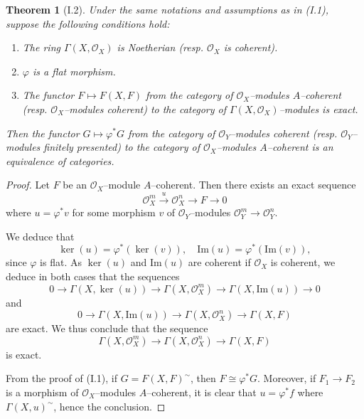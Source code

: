 \documentclass[10pt,a4paper]{amsart}
\newtheorem{theorem}{Theorem}
\begin{document}
\begin{theorem}[I.2]
Under the same notations and assumptions as in (I.1), suppose the following conditions hold:
\begin{enumerate}
\item The ring $\Gamma(X, \mathcal{O}_X)$ is Noetherian (resp. $\mathcal{O}_X$ is coherent).
\item $\varphi$ is a flat morphism.
\item The functor $F \mapsto F(X, F)$ from the category of $\mathcal{O}_X$–modules $A$–coherent (resp. $\mathcal{O}_X$–modules coherent) to the category of $\Gamma(X, \mathcal{O}_X)$–modules is exact.
\end{enumerate}
Then the functor $G \mapsto \varphi^* G$ from the category of $\mathcal{O}_Y$–modules coherent (resp. $\mathcal{O}_Y$–modules finitely presented) to the category of $\mathcal{O}_X$–modules $A$–coherent is an equivalence of categories.
\end{theorem}

\begin{proof}
Let $F$ be an $\mathcal{O}_X$–module $A$–coherent. Then there exists an exact sequence
\[
\mathcal{O}_X^m \xrightarrow{u} \mathcal{O}_X^n \longrightarrow F \longrightarrow 0
\]
where $u = \varphi^* v$ for some morphism $v$ of $\mathcal{O}_Y$–modules $\mathcal{O}_Y^m \to \mathcal{O}_Y^n$.  

We deduce that
\[
\ker(u) = \varphi^*(\ker(v)), \quad \mathrm{Im}(u) = \varphi^*(\mathrm{Im}(v)),
\]
since $\varphi$ is flat. As $\ker(u)$ and $\mathrm{Im}(u)$ are coherent if $\mathcal{O}_X$ is coherent, we deduce in both cases that the sequences
\[
0 \to \Gamma(X, \ker(u)) \to \Gamma(X, \mathcal{O}_X^m) \to \Gamma(X, \mathrm{Im}(u)) \to 0
\]
and
\[
0 \to \Gamma(X, \mathrm{Im}(u)) \to \Gamma(X, \mathcal{O}_X^n) \to \Gamma(X, F)
\]
are exact. We thus conclude that the sequence
\[
\Gamma(X, \mathcal{O}_X^m) \to \Gamma(X, \mathcal{O}_X^n) \to \Gamma(X, F)
\]
is exact.

From the proof of (I.1), if $G = F(X, F)^\sim$, then $F \cong \varphi^* G$. Moreover, if $F_1 \to F_2$ is a morphism of $\mathcal{O}_X$–modules $A$–coherent, it is clear that $u = \varphi^* f$ where $\Gamma(X, u)^\sim$, hence the conclusion.
\end{proof}
\end{document}
